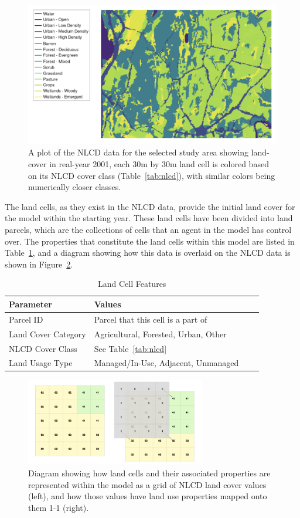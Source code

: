 \begin{figure}
\centering
    \includegraphics[width=.7\linewidth]{figure/lc5012}
    \caption{A plot of the NLCD data for the selected study area
    showing land-cover in real-year 2001, each 30m by 30m land cell is 
    colored based on its NLCD cover class (Table~\ref{tab:nlcd}),
    with similar colors being numerically closer classes.}
    \label{fig:land_plot}
\end{figure}

The land cells, as they exist in the NLCD data, provide the initial land
cover for the model within the starting year.
These land cells have been divided into land parcels,
which are the collections of cells that an agent in the model
has control over.
The properties that constitute the land cells within this model
are listed in Table~\ref{tab:land_cells},
and a diagram showing how this data is overlaid on the NLCD
data is shown in Figure~\ref{fig:land_cells}.

\begin{table}
\centering
\caption{Land Cell Features}
\label{tab:land_cells}
\begin{tabular}{llll}
\hline
\hline
    Parameter & Values \\
    \hline
    Parcel ID & Parcel that this cell is a part of \\
    Land Cover Category & Agricultural, Forested, Urban, Other \\
    NLCD Cover Class & See Table~\ref{tab:nlcd} \\
    Land Usage Type & Managed/In-Use, Adjacent, Unmanaged \\
    \hline
\end{tabular}
\end{table}

\begin{figure}
    \centering
    \includegraphics[width=0.7\textwidth]{figure/land-cells}
    \caption{Diagram showing how land cells and their
    associated properties are represented within the model as
    a grid of NLCD land cover values (left), and how those values
    have land use properties mapped onto them 1-1 (right).}
    \label{fig:land_cells}
\end{figure}

